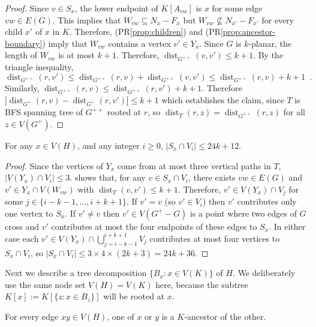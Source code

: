 \documentclass{patmorin}
\DeclareMathOperator{\dist}{dist}
\renewcommand{\propref}[1]{(PR\ref{prop:#1})}
\begin{document}
\begin{proof}
  Since $v\in S_x$, the lower endpoint of $K[A_{vw}]$ is $x$ for some edge $vw\in E(G)$.  This implies that $W_{vw}\subseteq N_x-F_x$ but $W_{vw} \not\subseteq N_{x'}-F_{x'}$ for every child $x'$ of $x$ in $K$. Therefore, \propref{children} and \propref{ancestor-boundary} imply that $W_{vw}$ contains a vertex $v'\in Y_x$.  Since $G$ is $k$-planar, the length of $W_{vw}$ is at most $k+1$.  Therefore, $\dist_{G^{++}}(v,v') \le k+1$.
  By the triangle inequality,     
  \[
    \dist_{G^{++}}(r,v') \le \dist_{G^{++}}(r,v) + \dist_{G^{++}}(v,v') 
       \le \dist_{G^{++}}(r,v) + k + 1 \enspace .
  \]
  Similarly, $\dist_{G^{++}}(r,v) \le \dist_{G^{++}}(r, v') + k+1$.  Therefore
  $|\dist_{G^+}(r,v)-\dist_{G^+}(r,v')| \le k+1$ which establishes the claim, since $T$ is BFS spanning tree of $G^{++}$ rooted at $r$, so $\dist_{T}(r,z)=\dist_{G^{++}}(r,z)$ for all $z\in V(G^+)$.
\end{proof}

\begin{clm}
  For any $x\in V(H)$, and any integer $i\ge 0$, $|S_x\cap V_i|\le 24k+12$.
\end{clm}

\begin{proof}
  Since the vertices of $Y_x$ come from at most three vertical paths in $T$, $|V(Y_x)\cap V_i|\le 3$.   shows that, for any $v\in S_x\cap V_i$, there exists $vw\in E(G)$ and $v'\in Y_x\cap V(W_{vw})$ with $\dist_T(v,v')\le k+1$. Therefore, $v'\in V(Y_x)\cap V_{j}$ for some $j\in\{i-k-1,\ldots,i+k+1\}$.  If $v'=v$ (so $v'\in V_i$) then $v'$ contributes only one vertex to $S_x$.  If $v'\neq v$ then $v'\in V(G^+-G)$ is a point where two edges of $G$ cross and $v'$ contributes at most the four endpoints of these edges to $S_x$. In either case each $v'\in V(Y_x)\cap \bigcup_{j=i-k-1}^{i+k+1} V_j$ contributes at most four vertices to $S_x\cap V_i$, so $|S_x\cap V_i|\le 3\times 4\times (2k+3) = 24k+36$.
\end{proof}

Next we describe a tree decomposition $\{B_x:x\in V(K)\}$ of $H$.  We deliberately use the same node set $V(H)=V(K)$ here, because the subtree $K[x]:=K[\{z:x\in B_z\}]$ will be rooted at $x$.  

\begin{clm}
   For every edge $xy\in V(H)$, one of $x$ or $y$ is a $K$-ancestor of the other.
 \end{clm}
 
\end{document}
